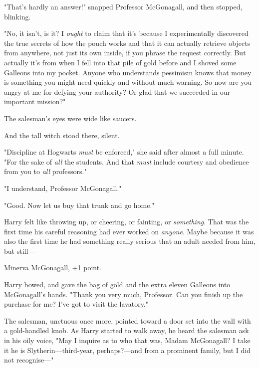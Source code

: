 "That's hardly an answer!" snapped Professor McGonagall, and then stopped, 
blinking.

"No, it isn't, is it? I \emph{ought} to claim that it's because I 
experimentally discovered the true secrets of how the pouch works and that it 
can actually retrieve objects from anywhere, not just its own inside, if you 
phrase the request correctly. But actually it's from when I fell into that pile 
of gold before and I shoved some Galleons into my pocket. Anyone who 
understands pessimism knows that money is something you might need quickly and 
without much warning. So now are you angry at me for defying your authority? Or 
glad that we succeeded in our important mission?"

The salesman's eyes were wide like saucers.

And the tall witch stood there, silent.

"Discipline at Hogwarts \emph{must} be enforced," she said after almost a full 
minute. "For the sake of \emph{all} the students. And that \emph{must} include 
courtesy and obedience from you to \emph{all} professors."

"I understand, Professor McGonagall."

"Good. Now let us buy that trunk and go home."

Harry felt like throwing up, or cheering, or fainting, or \emph{something}. 
That was the first time his careful reasoning had ever worked on \emph{anyone}. 
Maybe because it was also the first time he had something really serious that 
an adult needed from him, but still---

Minerva McGonagall, +1 point.

Harry bowed, and gave the bag of gold and the extra eleven Galleons into 
McGonagall's hands. "Thank you very much, Professor. Can you finish up the 
purchase for me? I've got to visit the lavatory."

The salesman, unctuous once more, pointed toward a door set into the wall with 
a gold-handled knob. As Harry started to walk away, he heard the salesman ask 
in his oily voice, "May I inquire as to who that was, Madam McGonagall? I take 
it he is Slytherin---third-year, perhaps?---and from a prominent family, but I 
did not recognise---"

